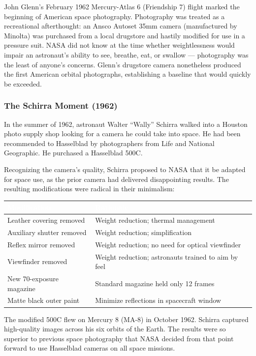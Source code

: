 \documentclass[11pt,letterpaper]{article}
\newcommand{\tableheader}[1]{\textbf{\sffamily\textcolor{white}{#1}}}
\begin{document}
John Glenn's February 1962 Mercury-Atlas 6 (Friendship 7) flight marked the beginning of American space photography. Photography was treated as a recreational afterthought: an Ansco Autoset 35mm camera (manufactured by Minolta) was purchased from a local drugstore and hastily modified for use in a pressure suit. NASA did not know at the time whether weightlessness would impair an astronaut's ability to see, breathe, eat, or swallow --- photography was the least of anyone's concerns. Glenn's drugstore camera nonetheless produced the first American orbital photographs, establishing a baseline that would quickly be exceeded.

\subsubsection{The Schirra Moment (1962)}

In the summer of 1962, astronaut Walter ``Wally'' Schirra walked into a Houston photo supply shop looking for a camera he could take into space. He had been recommended to Hasselblad by photographers from Life and National Geographic. He purchased a Hasselblad 500C.

Recognizing the camera's quality, Schirra proposed to NASA that it be adapted for space use, as the prior camera had delivered disappointing results. The resulting modifications were radical in their minimalism:

\begin{center}
\begin{tabularx}{\textwidth}{L{5cm}X}
\toprule
{}
\tableheader{Modification} & \tableheader{Rationale} \\
\midrule
Leather covering removed & Weight reduction; thermal management \\
Auxiliary shutter removed & Weight reduction; simplification \\
Reflex mirror removed & Weight reduction; no need for optical viewfinder \\
Viewfinder removed & Weight reduction; astronauts trained to aim by feel \\
New 70-exposure magazine & Standard magazine held only 12 frames \\
Matte black outer paint & Minimize reflections in spacecraft window \\
\bottomrule
\end{tabularx}
\end{center}

The modified 500C flew on Mercury 8 (MA-8) in October 1962. Schirra captured high-quality images across his six orbits of the Earth. The results were so superior to previous space photography that NASA decided from that point forward to use Hasselblad cameras on all space missions.
\end{document}
